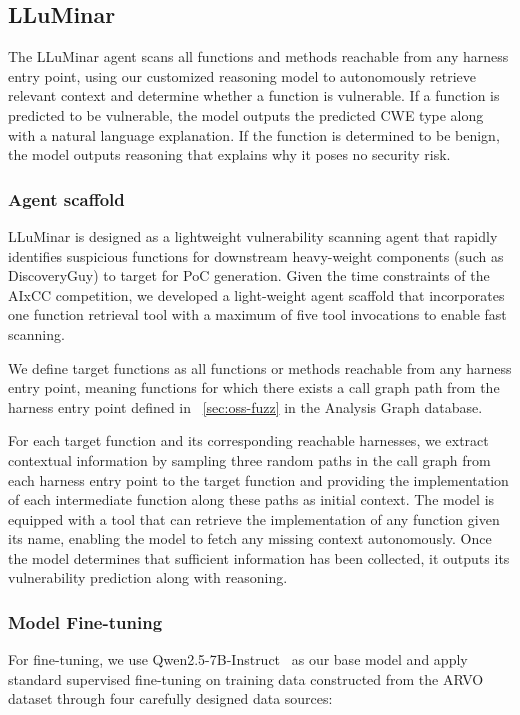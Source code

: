 \subsection{LLuMinar}
\label{lluminar}
The LLuMinar agent scans all functions and methods reachable from any harness entry point, using our customized reasoning model to autonomously retrieve relevant context and determine whether a function is vulnerable. If a function is predicted to be vulnerable, the model outputs the predicted CWE type along with a natural language explanation. If the function is determined to be benign, the model outputs reasoning that explains why it poses no security risk.

\subsubsection{Agent scaffold}
\label{sec:lluminar_agent}

LLuMinar is designed as a lightweight vulnerability scanning agent that rapidly identifies suspicious functions for downstream heavy-weight components (such as DiscoveryGuy) to target for PoC generation. 
Given the time constraints of the AIxCC competition, we developed a light-weight agent scaffold that incorporates one function retrieval tool with a maximum of five tool invocations to enable fast scanning.

We define target functions as all functions or methods reachable from any harness entry point, meaning functions for which there exists a call graph path from the harness entry point defined in ~\cref{sec:oss-fuzz} in the Analysis Graph database. 

For each target function and its corresponding reachable harnesses, we extract contextual information by sampling three random paths in the call graph from each harness entry point to the target function and providing the implementation of each intermediate function along these paths as initial context. 
The model is equipped with a tool that can retrieve the implementation of any function given its name, enabling the model to fetch any missing context autonomously. 
Once the model determines that sufficient information has been collected, it outputs its vulnerability prediction along with reasoning. 

\subsubsection{Model Fine-tuning}

For fine-tuning, we use Qwen2.5-7B-Instruct~\cite{yang2024qwen2} as our base model and apply standard supervised fine-tuning on training data constructed from the ARVO~\cite{mei2024arvo} dataset through four carefully designed data sources:

